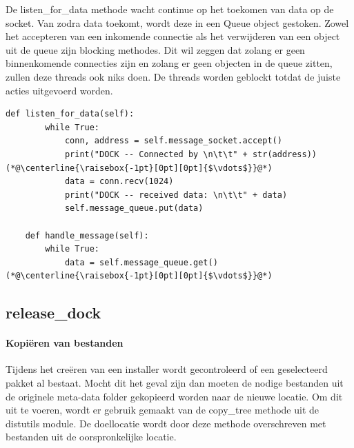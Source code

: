 De listen\_for\_data methode wacht continue op het toekomen van data op de socket.
Van zodra data toekomt, wordt deze in een Queue object gestoken.
Zowel het accepteren van een inkomende connectie als het verwijderen van een object uit de queue zijn blocking methodes.
Dit wil zeggen dat zolang er geen binnenkomende connecties zijn en zolang er geen objecten in de queue zitten, zullen deze threads ook niks doen.
De threads worden geblockt totdat de juiste acties uitgevoerd worden.

\begin{minipage}{\linewidth}
\begin{center}
\begin{lstlisting}[caption={Ontvangen en afhandelen van data},label={list:receiveData}]
    def listen_for_data(self):
        while True:
            conn, address = self.message_socket.accept()
            print("DOCK -- Connected by \n\t\t" + str(address))
(*@\centerline{\raisebox{-1pt}[0pt][0pt]{$\vdots$}}@*)
            data = conn.recv(1024)
            print("DOCK -- received data: \n\t\t" + data)
            self.message_queue.put(data)
            
    def handle_message(self):
        while True:
            data = self.message_queue.get()
(*@\centerline{\raisebox{-1pt}[0pt][0pt]{$\vdots$}}@*)
\end{lstlisting}
\end{center}
\end{minipage}

\subsection{release\_dock}
\paragraph{Kopiëren van bestanden} %
Tijdens het creëren van een installer wordt gecontroleerd of een geselecteerd pakket al bestaat.
Mocht dit het geval zijn dan moeten de nodige bestanden uit de originele meta-data folder gekopieerd worden naar de nieuwe locatie.
Om dit uit te voeren, wordt er gebruik gemaakt van de copy\_tree methode uit de distutils module.
De doellocatie wordt door deze methode overschreven met bestanden uit de oorspronkelijke locatie.


